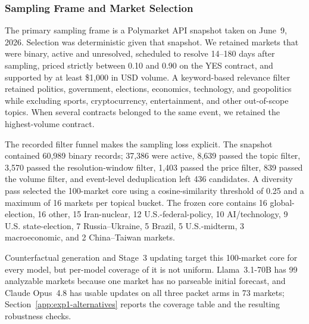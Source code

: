 \subsubsection{Sampling Frame and Market Selection}
\label{app:market-selection}

The primary sampling frame is a Polymarket API snapshot taken on June~9, 2026.
Selection was deterministic given that snapshot.  We retained markets that were
binary, active and unresolved, scheduled to resolve 14--180 days after sampling,
priced strictly between 0.10 and 0.90 on the YES contract, and supported by at least
\$1,000 in USD volume.  A keyword-based relevance filter retained politics,
government, elections, economics, technology, and geopolitics while excluding
sports, cryptocurrency, entertainment, and other out-of-scope topics.  When several
contracts belonged to the same event, we retained the highest-volume contract.

The recorded filter funnel makes the sampling loss explicit.  The snapshot contained
60,989 binary records; 37,386 were active, 8,639 passed the topic filter, 3,570 passed
the resolution-window filter, 1,403 passed the price filter, 839 passed the volume
filter, and event-level deduplication left 436 candidates.  A diversity pass selected
the 100-market core using a cosine-similarity threshold of 0.25 and a maximum of
16 markets per topical bucket.  The frozen core contains 16 global-election,
16 other, 15 Iran-nuclear, 12 U.S.-federal-policy, 10 AI/technology, 9 U.S.
state-election, 7 Russia--Ukraine, 5 Brazil, 5 U.S.-midterm, 3 macroeconomic,
and 2 China--Taiwan markets.

Counterfactual generation and Stage~3 updating target this 100-market core for
every model, but per-model coverage of it is not uniform. Llama~3.1-70B has 99
analyzable markets because one market has no parseable initial forecast, and
Claude Opus~4.8 has usable updates on all three packet arms in 73 markets;
Section~\ref{app:exp1-alternatives} reports the coverage table and the resulting
robustness checks.

\begin{center}
\begin{minipage}{\linewidth}
\centering
{}
\label{tab:markets}
\footnotesize
{}
\end{minipage}
\end{center}

